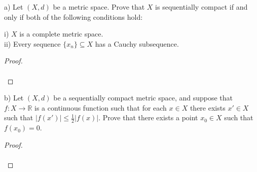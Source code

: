 a) Let $(X, d)$ be a metric space. Prove that $X$ is sequentially compact if and only if both of the following 
   conditions hold:

   i) $X$ is a complete metric space. \\
   ii) Every sequence $\{ x_n \} \subseteq X$ has a Cauchy subsequence.

\begin{proof}\renewcommand{\qedsymbol}{}\ \\\\
\end{proof}

\pagebreak


b) Let $(X, d)$ be a sequentially compact metric space, and suppose that $f:X \to \mathbb{R}$ is a continuous function
   such that for each $x \in X$ there exists $x' \in X$ such that $|f(x')| \le \frac{1}{2}|f(x)|$.  Prove that there 
   exists a point $x_0 \in X$ such that $f(x_0) = 0$.

\begin{proof}\renewcommand{\qedsymbol}{}\ \\\\
\end{proof}

\pagebreak